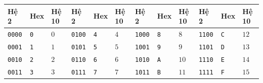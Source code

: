 \begin{tcolorbox}[bwbox, title={Bảng quy đổi chuẩn giữa 4-bit Nhị phân, Hệ Hexa và Hệ Thập phân}]
\begin{center}
\renewcommand{\arraystretch}{1.2}
\small
\begin{tabularx}{\linewidth}{|Z|Z|Z||Z|Z|Z||Z|Z|Z||Z|Z|Z|}
\hline
\textbf{Hệ 2} & \textbf{Hex} & \textbf{Hệ 10} & \textbf{Hệ 2} & \textbf{Hex} & \textbf{Hệ 10} & \textbf{Hệ 2} & \textbf{Hex} & \textbf{Hệ 10} & \textbf{Hệ 2} & \textbf{Hex} & \textbf{Hệ 10} \\ \hline
\texttt{0000} & \texttt{0} & $0$ & \texttt{0100} & \texttt{4} & $4$ & \texttt{1000} & \texttt{8} & $8$ & \texttt{1100} & \texttt{C} & $12$ \\ \hline
\texttt{0001} & \texttt{1} & $1$ & \texttt{0101} & \texttt{5} & $5$ & \texttt{1001} & \texttt{9} & $9$ & \texttt{1101} & \texttt{D} & $13$ \\ \hline
\texttt{0010} & \texttt{2} & $2$ & \texttt{0110} & \texttt{6} & $6$ & \texttt{1010} & \texttt{A} & $10$ & \texttt{1110} & \texttt{E} & $14$ \\ \hline
\texttt{0011} & \texttt{3} & $3$ & \texttt{0111} & \texttt{7} & $7$ & \texttt{1011} & \texttt{B} & $11$ & \texttt{1111} & \texttt{F} & $15$ \\ \hline
\end{tabularx}
\end{center}
\end{tcolorbox}

